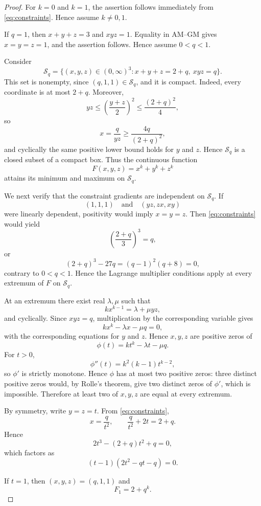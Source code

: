 \documentclass[10pt,a4paper]{amsart}
\begin{document}
\begin{proof}
For $k=0$ and $k=1$, the assertion follows immediately from
\eqref{eq:constraints}. Hence assume $k\ne0,1$.

If $q=1$, then $x+y+z=3$ and $xyz=1$. Equality in AM--GM gives
$x=y=z=1$, and the assertion follows. Hence assume $0<q<1$.

Consider
\[
 \mathcal S_q=\{(x,y,z)\in(0,\infty)^3:x+y+z=2+q,\ xyz=q\}.
\]
This set is nonempty, since $(q,1,1)\in\mathcal S_q$, and it is compact. Indeed, every coordinate is at most $2+q$. Moreover,
\[
 yz\le \left(\frac{y+z}{2}\right)^2\le\frac{(2+q)^2}{4},
\]
so
\[
 x=\frac{q}{yz}\ge\frac{4q}{(2+q)^2},
\]
and cyclically the same positive lower bound holds for $y$ and $z$. Hence $\mathcal S_q$ is a closed subset of a compact box. Thus the continuous function
\[
 F(x,y,z)=x^k+y^k+z^k
\]
attains its minimum and maximum on $\mathcal S_q$.

We next verify that the constraint gradients are independent on $\mathcal S_q$. If
\[
 (1,1,1)\quad\text{and}\quad(yz,zx,xy)
\]
were linearly dependent, positivity would imply $x=y=z$. Then \eqref{eq:constraints} would yield
\[
 \left(\frac{2+q}{3}\right)^3=q,
\]
or
\[
 (2+q)^3-27q=(q-1)^2(q+8)=0,
\]
contrary to $0<q<1$. Hence the Lagrange multiplier conditions apply at every extremum of $F$ on $\mathcal S_q$.

At an extremum there exist real $\lambda,\mu$ such that
\[
 kx^{k-1}=\lambda+\mu yz,
\]
and cyclically. Since $xyz=q$, multiplication by the corresponding variable gives
\[
 kx^k-\lambda x-\mu q=0,
\]
with the corresponding equations for $y$ and $z$. Hence $x,y,z$ are positive zeros of
\[
 \phi(t)=kt^k-\lambda t-\mu q.
\]
For $t>0$,
\[
 \phi''(t)=k^2(k-1)t^{k-2},
\]
so $\phi'$ is strictly monotone. Hence $\phi$ has at most two positive
zeros: three distinct positive zeros would, by Rolle's theorem, give two
distinct zeros of $\phi'$, which is impossible. Therefore at least two
of $x,y,z$ are equal at every extremum.

By symmetry, write $y=z=t$. From \eqref{eq:constraints},
\[
 x=\frac{q}{t^2},\qquad \frac{q}{t^2}+2t=2+q.
\]
Hence
\[
 2t^3-(2+q)t^2+q=0,
\]
which factors as
\begin{equation}\label{eq:factor}
 (t-1)(2t^2-qt-q)=0.
\end{equation}

If $t=1$, then $(x,y,z)=(q,1,1)$ and
\begin{equation}\label{eq:F1}
 F_1=2+q^k.
\end{equation}


\end{proof}
\end{document}
